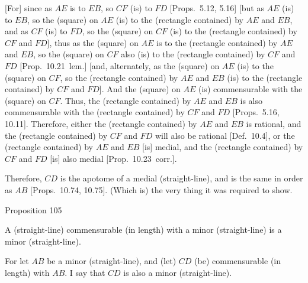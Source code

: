 \mbox{[}For] since as $AE$ is to $EB$, so $CF$ (is) to $FD$ [Props.~5.12, 5.16] [but
as $AE$ (is) to $EB$, so the (square) on $AE$ (is) to the (rectangle
contained) by $AE$ and $EB$, and as $CF$ (is) to $FD$, so the
(square) on $CF$ (is) to the (rectangle contained) by $CF$ and $FD$],
thus as  the (square) on $AE$ is to the (rectangle contained) by $AE$
and $EB$, so the (square) on $CF$ also (is) to the (rectangle contained)
by $CF$ and $FD$ [Prop.~10.21~lem.] [and,
alternately, as the (square) on $AE$ (is) to the (square) on $CF$, so
the (rectangle contained) by $AE$ and $EB$ (is) to the (rectangle contained)
by $CF$ and $FD$]. And the (square) on $AE$ (is) commensurable
with the (square) on $CF$. Thus, the (rectangle contained) by $AE$ and
$EB$ is also commensurable with the (rectangle contained) by $CF$ and
$FD$ [Props.~5.16, 10.11].
Therefore, either the (rectangle contained) by $AE$ and $EB$ is rational, and
the (rectangle contained) by $CF$ and $FD$ will also be rational [Def.~10.4], or
the (rectangle contained) by $AE$ and $EB$ [is] medial, and the
(rectangle contained) by $CF$ and $FD$ [is] also medial [Prop.~10.23~corr.].

Therefore, $CD$ is the apotome of a medial (straight-line), and is
the same in order as $AB$ [Props.~10.74, 10.75]. (Which is) the very thing it was required to show.


\begin{center}
{\large Proposition 105}
\end{center}

A (straight-line) commensurable (in length) with a minor (straight-line) is a minor (straight-line).

\epsfysize=0.7in
\centerline{}

For let $AB$ be a minor (straight-line), and (let) $CD$ (be) commensurable
(in length) with $AB$. I say that $CD$ is also a minor (straight-line).

